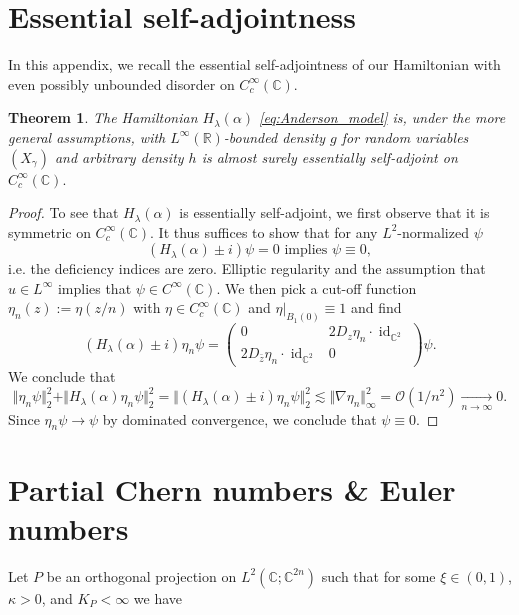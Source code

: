 \documentclass[reqno,12pt,letterpaper]{amsart}
\newcommand{\RR}{{\mathbb R}}
\newcommand{\CC}{{\mathbb C}}
\newtheorem{theo}{Theorem}
\numberwithin{equation}{section}
\begin{document}
\begin{appendix}
\section{Essential self-adjointness}

In this appendix, we recall the essential self-adjointness of our Hamiltonian with even possibly unbounded disorder on $C_c^{\infty}(\CC)$. 
\begin{theo}
\label{theo:essentially_self}
The Hamiltonian $H_{\lambda}(\alpha)$ \eqref{eq:Anderson_model} is, under the more general assumptions, with $L^{\infty}(\RR)$-bounded density $g$ for random variables $(X_{\gamma})$ and arbitrary density $h$ is almost surely essentially self-adjoint on $C_c^{\infty}(\CC).$
\end{theo}
\begin{proof}
To see that $H_{\lambda}(\alpha)$ is essentially self-adjoint, we first observe that it is symmetric on $C_c^{\infty}(\CC).$ It thus suffices to show that for any $L^2$-normalized $\psi$
\[(H_{\lambda}(\alpha) \pm i) \psi= 0 \text{ implies }\psi\equiv 0, \]
i.e. the deficiency indices are zero.
Elliptic regularity and the assumption that $u \in L^{\infty} $ implies that $\psi \in C^{\infty}(\CC)$.
We then pick a cut-off function $\eta_n(z):=\eta(z/n)$ with $\eta\in C_c^{\infty}(\CC)$ and $\eta\vert_{B_1(0)} \equiv 1$ and find 
\[ (H_{\lambda}(\alpha) \pm i) \eta_n \psi = \begin{pmatrix} 0 & 2D_{z}\eta_n \cdot \operatorname{id}_{\mathbb C^2} \\ 2 D_{\bar z}\eta_n \cdot \operatorname{id}_{\mathbb C^2} & 0 \end{pmatrix}   \psi.\]
We conclude that 
\[ \Vert \eta_n \psi \Vert_2^2 + \Vert H_{\lambda}(\alpha) \eta_n \psi \Vert_2^2 = \Vert (H_{\lambda}(\alpha)  \pm i ) \eta_n \psi \Vert_2^2 \lesssim \Vert \nabla \eta_n \Vert_{\infty}^2 = \mathcal O(1/n^2) \xrightarrow[n \to \infty]{} 0.\]
Since $\eta_n \psi \to \psi$ by dominated convergence, we conclude that $\psi \equiv 0.$
\end{proof}

\section{Partial Chern numbers \& Euler numbers}
\label{sec:Partial_Chern}
Let $P$ be an orthogonal projection on $L^2(\CC;\CC^{2n})$ such that for some $\xi \in (0,1)$, $\kappa>0$, and $K_P<\infty$ we have 


\end{appendix}
\end{document}
